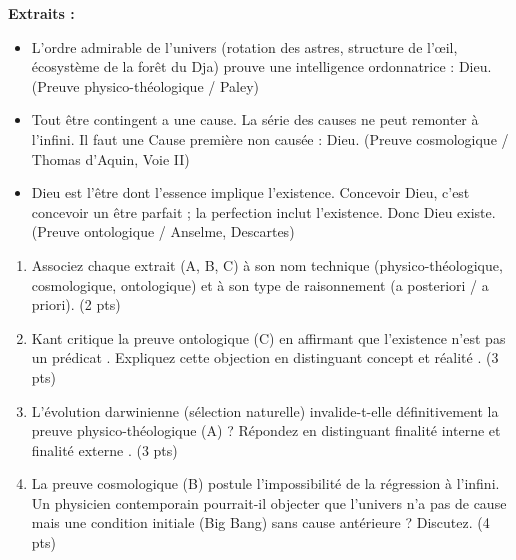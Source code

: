 \documentclass[11pt]{article}
\begin{document}
\begin{exercice}
\textbf{Extraits :}
\begin{itemize}
    \item[A.] \og L'ordre admirable de l'univers (rotation des astres, structure de l'œil, écosystème de la forêt du Dja) prouve une intelligence ordonnatrice : Dieu. \fg{} (Preuve physico-théologique / Paley)
    \item[B.] \og Tout être contingent a une cause. La série des causes ne peut remonter à l'infini. Il faut une Cause première non causée : Dieu. \fg{} (Preuve cosmologique / Thomas d'Aquin, Voie II)
    \item[C.] \og Dieu est l'être dont l'essence implique l'existence. Concevoir Dieu, c'est concevoir un être parfait ; la perfection inclut l'existence. Donc Dieu existe. \fg{} (Preuve ontologique / Anselme, Descartes)
\end{itemize}

\begin{enumerate}
    \item Associez chaque extrait (A, B, C) à son nom technique (physico-théologique, cosmologique, ontologique) et à son type de raisonnement (a posteriori / a priori). (2 pts)
    \item Kant critique la preuve ontologique (C) en affirmant que \og l'existence n'est pas un prédicat \fg{}. Expliquez cette objection en distinguant \og concept \fg{} et \og réalité \fg{}. (3 pts)
    \item L'évolution darwinienne (sélection naturelle) invalide-t-elle définitivement la preuve physico-théologique (A) ? Répondez en distinguant \og finalité interne \fg{} et \og finalité externe \fg{}. (3 pts)
    \item La preuve cosmologique (B) postule l'impossibilité de la régression à l'infini. Un physicien contemporain pourrait-il objecter que l'univers n'a pas de \og cause \fg{} mais une \og condition initiale \fg{} (Big Bang) sans cause antérieure ? Discutez. (4 pts)
\end{enumerate}
\end{exercice}
\end{document}
